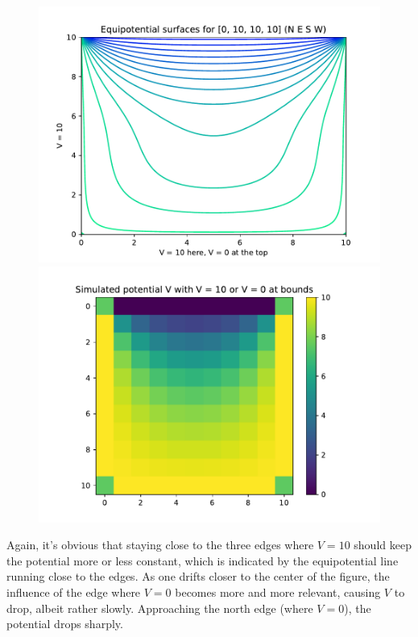 \documentclass[a4paper,12pt]{article}
\begin{document}
\begin{figure}[!ht]
  \centering
  \begin{minipage}{0.49\textwidth}
    \includegraphics[width=\textwidth]{img/4_1c_equipotential_1010010.pdf}
  \end{minipage}
  \begin{minipage}{0.49\textwidth}
    \includegraphics[width=\textwidth]{img/4_1c_simulated_1010010.pdf}
  \end{minipage}
\end{figure}

Again, it's obvious that staying close to the three edges where $V = 10$ should keep the potential more or less
constant, which is indicated by the equipotential line running close to the edges. As one drifts closer to the center
of the figure, the influence of the edge where $V = 0$ becomes more and more relevant, causing $V$ to drop, albeit
rather slowly. Approaching the north edge (where $V = 0$), the potential drops sharply.
\end{document}
